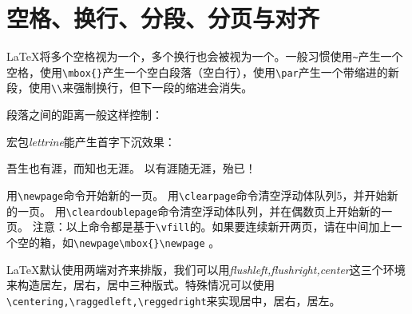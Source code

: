 \section{空格、换行、分段、分页与对齐}

\LaTeX 将多个空格视为一个，多个换行也会被视为一个。一般习惯使用\verb|~|产生一个空格，使用\verb|\mbox{}|产生一个空白段落（空白行），使用\verb|\par|产生一个带缩进的新段，使用\verb|\\|来强制换行，但下一段的缩进会消失。

段落之间的距离一般这样控制：

\begin{latex}{}
\setlength{\parskip}{0pt plus 1pt}%
\end{latex}

宏包\emph{lettrine}能产生首字下沉效果：

\begin{codeshow}
	\lettrine{吾}{}生也有涯，而知也无涯。
	以有涯随无涯，殆已！
\end{codeshow}

用\verb|\newpage|命令开始新的一页。
用\verb|\clearpage|命令清空浮动体队列5，并开始新的一页。
用\verb|\cleardoublepage|命令清空浮动体队列，并在偶数页上开始新的一页。
注意：以上命令都是基于\verb|\vfill|的。如果要连续新开两页，请在中间加上一个空的箱，如\verb|\newpage\mbox{}\newpage| 。

\LaTeX 默认使用两端对齐来排版，我们可以用\emph{flushleft,flushright,center}这三个环境来构造居左，居右，居中三种版式。特殊情况可以使用\verb|\centering,\raggedleft,\reggedright|来实现居中，居右，居左。







